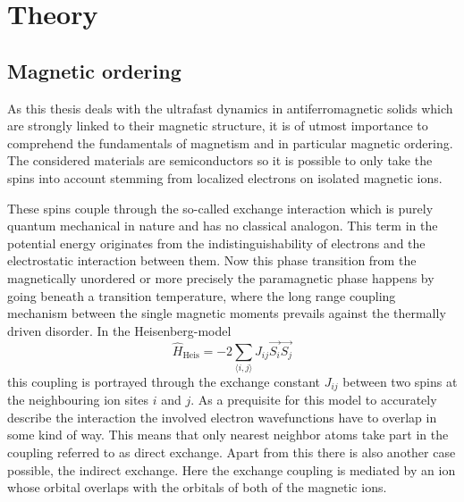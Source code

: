 \chapter{Theory}

\section{Magnetic ordering}
As this thesis deals with the ultrafast dynamics in antiferromagnetic solids which are strongly linked to their magnetic structure, it is of utmost importance to comprehend the fundamentals of magnetism and in particular magnetic ordering.
The considered materials are semiconductors so it is possible to only take the spins into account stemming from localized electrons on isolated magnetic ions.

These spins couple through the so-called exchange interaction which is purely quantum mechanical in nature and has no classical analogon.
This term in the potential energy originates from the indistinguishability of electrons and the electrostatic interaction between them.
Now this phase transition from the magnetically unordered or more precisely the paramagnetic phase happens by going beneath a transition temperature, where the long range coupling mechanism between the single magnetic moments prevails against the thermally driven disorder.
In the Heisenberg-model
\begin{equation}
    \hat{H}_{\text{Heis}} = -2 \sum_{\langle i,j \rangle} J_{ij} \vec{S_i} \vec{S_j}
\end{equation}
this coupling is portrayed through the exchange constant $J_{ij}$ between two spins at the neighbouring ion sites $i$ and $j$.
As a prequisite for this model to accurately describe the interaction the involved electron wavefunctions have to overlap in some kind of way.
This means that only nearest neighbor atoms take part in the coupling referred to as direct exchange.
Apart from this there is also another case possible, the indirect exchange.
Here the exchange coupling is mediated by an ion whose orbital overlaps with the orbitals of both of the magnetic ions.

